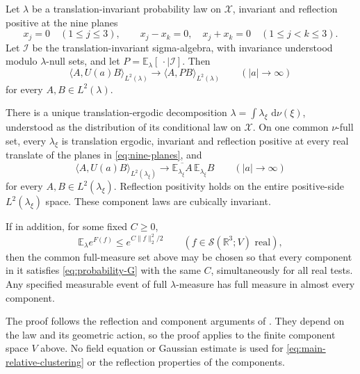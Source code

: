 \documentclass[11pt,letterpaper,reqno]{amsart}
\newcommand{\R}{\mathbb R}
\newcommand{\E}{\mathbb E}
\newcommand{\dd}{\,\mathrm d}
\begin{document}
\begin{theorem}\label{thm:components-clustering}
Let \(\lambda\) be a translation-invariant probability law on
\(\mathcal X\), invariant and reflection positive at the nine planes
\begin{equation}\label{eq:nine-planes}
 x_j=0\quad(1\le j\le3),\qquad
 x_j-x_k=0,\quad x_j+x_k=0\quad(1\le j<k\le3).
\end{equation}
Let \(\mathcal I\) be the translation-invariant sigma-algebra,
with invariance understood modulo \(\lambda\)-null sets, and let
\(P=\E_\lambda[\,\cdot\mid\mathcal I]\). Then
\begin{equation}\label{eq:main-relative-clustering}
 \langle A,U(a)B\rangle_{L^2(\lambda)}
 \longrightarrow\langle A,PB\rangle_{L^2(\lambda)}
 \qquad(|a|\longrightarrow\infty)
\end{equation}
for every \(A,B\in L^2(\lambda)\).

There is a unique translation-ergodic decomposition
\(\lambda=\int\lambda_\xi\,\dd\nu(\xi)\), understood as the
distribution of its conditional law on \(\mathcal X\).
On one common \(\nu\)-full set, every \(\lambda_\xi\) is
translation ergodic, invariant and reflection positive at every
real translate of the planes in \eqref{eq:nine-planes}, and
\begin{equation}\label{eq:main-component-clustering}
 \langle A,U(a)B\rangle_{L^2(\lambda_\xi)}
 \longrightarrow
 \overline{\E_{\lambda_\xi}A}\,\E_{\lambda_\xi}B
 \qquad(|a|\longrightarrow\infty)
\end{equation}
for every \(A,B\in L^2(\lambda_\xi)\).
Reflection positivity holds on the entire positive-side
\(L^2(\lambda_\xi)\) space. These component laws are cubically invariant.

If in addition, for some fixed \(C\ge0\),
\begin{equation}\label{eq:probability-G}
 \E_\lambda e^{F(f)}\le e^{C\|f\|_2^2/2}
 \qquad(f\in\mathcal S(\R^3;V)\text{ real}),
\end{equation}
then the common full-measure set above may be chosen so that every
component in it satisfies \eqref{eq:probability-G} with the same
\(C\), simultaneously for all real tests.
Any specified measurable event of full \(\lambda\)-measure has
full measure in almost every component.
\end{theorem}

The proof follows the reflection and component arguments of
\cite[Section~7]{QED3Manuscript}. They depend on the law and its
geometric action, so the proof applies to the finite component
space \(V\) above. No field equation or Gaussian estimate is used
for \eqref{eq:main-relative-clustering} or the reflection properties
of the components.
\end{document}
